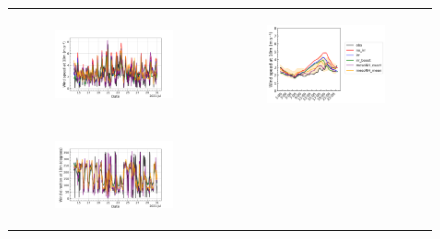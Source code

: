 \begin{figure}[hbtp]
    \centering
    \begin{tabular}{cc}
        \begin{subfigure}[t]{0.5\textwidth}
            \caption{}
            \includegraphics[width=\textwidth]{images/chap5/SOP_TS_DC/time_series_cendrosa_wind_speed_10m.png}
        \end{subfigure} &
        \begin{subfigure}[t]{0.5\textwidth}
            \caption{}
            \includegraphics[width=\textwidth]{images/chap5/SOP_TS_DC/diurnal_cycle_cendrosa_wind_speed_10m.png}
        \end{subfigure} \\
        \begin{subfigure}[t]{0.5\textwidth}
            \caption{}
            \includegraphics[width=\textwidth]{images/chap5/SOP_TS_DC/time_series_cendrosa_wind_direction_10m.png}

\end{subfigure}
\end{tabular}
\end{figure}

